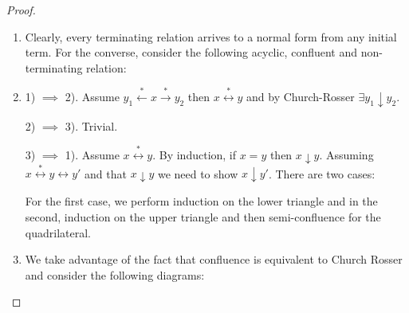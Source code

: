 \begin{proof}
\begin{enumerate}
\item Clearly, every terminating relation arrives to a normal form from any initial term. For the converse, consider the following acyclic, confluent and non-terminating relation:


\item 1) $\implies$ 2). Assume $y_1 \stackrel{*}{\leftarrow} x \stackrel{*}{\rightarrow} y_2$ then $x \stackrel{*}{\leftrightarrow} y$ and by Church-Rosser $\exists y_1 \downarrow y_2$.

2) $\implies$ 3). Trivial.

3) $\implies$ 1). Assume $x \stackrel{*}{\leftrightarrow} y$. By induction, if $x = y$ then $x \downarrow y$. Assuming $x \stackrel{*}{\leftrightarrow} y \leftrightarrow y'$ and that $x \downarrow y$ we need to show $x \downarrow y'$. There are two cases:

 \hspace{3mm}

For the first case, we perform induction on the lower triangle and in the second, induction on the upper triangle and then semi-confluence for the quadrilateral.

\item We take advantage of the fact that confluence is equivalent to Church Rosser and consider the following diagrams:

 \hspace{3mm}
\begin{tikzpicture}


\end{tikzpicture}
\end{enumerate}
\end{proof}
